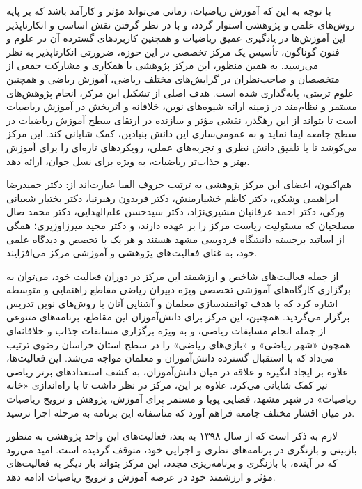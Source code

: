 \documentclass[
  letterpaper,
  DIV=11,
  numbers=noendperiod]{scrreprt}
\begin{document}
با توجه به این که آموزش ریاضیات، زمانی می‌تواند مؤثر و کارآمد باشد که بر
پایه روش‌های علمی و پژوهشی استوار گردد، و با در نظر گرفتن نقش اساسی و
انکارناپذیر این آموزش‌ها در یادگیری عمیق ریاضیات و همچنین کاربردهای
گسترده آن در علوم و فنون گوناگون، تأسیس یک مرکز تخصصی در این حوزه،
ضرورتی انکارناپذیر به نظر می‌رسید. به همین منظور، این مرکز پژوهشی با
همکاری و مشارکت جمعی از متخصصان و صاحب‌نظران در گرایش‌های مختلف ریاضی،
آموزش ریاضی و همچنین علوم تربیتی، پایه‌گذاری شده است. هدف اصلی از تشکیل
این مرکز، انجام پژوهش‌های مستمر و نظام‌مند در زمینه ارائه شیوه‌های نوین،
خلاقانه و اثربخش در آموزش ریاضیات است تا بتواند از این رهگذر، نقشی مؤثر
و سازنده در ارتقای سطح آموزش ریاضیات در سطح جامعه ایفا نماید و به
عمومی‌سازی این دانش بنیادین، کمک شایانی کند. این مرکز می‌کوشد تا با تلفیق
دانش نظری و تجربه‌های عملی، رویکردهای تازه‌ای را برای آموزش بهتر و جذاب‌تر
ریاضیات، به ویژه برای نسل جوان، ارائه دهد.

هم‌اکنون، اعضای این مرکز پژوهشی به ترتیب حروف الفبا عبارت‌اند از: دکتر
حمیدرضا ابراهیمی وشکی، دکتر کاظم خشیارمنش، دکتر فریدون رهبرنیا، دکتر
بختیار شعبانی ورکی، دکتر احمد عرفانیان مشیری‌نژاد، دکتر سیدحسن
علم‌الهدایی، دکتر محمد صال مصلحیان که مسئولیت ریاست مرکز را بر عهده
دارند، و دکتر مجید میرزاوزیری؛ همگی از اساتید برجسته دانشگاه فردوسی مشهد
هستند و هر یک با تخصص و دیدگاه علمی خود، به غنای فعالیت‌های پژوهشی و
آموزشی مرکز می‌افزایند.

از جمله فعالیت‌های شاخص و ارزشمند این مرکز در دوران فعالیت خود، می‌توان به
برگزاری کارگاه‌های آموزشی تخصصی ویژه دبیران ریاضی مقاطع راهنمایی و متوسطه
اشاره کرد که با هدف توانمندسازی معلمان و آشنایی آنان با روش‌های نوین
تدریس برگزار می‌گردید. همچنین، این مرکز برای دانش‌آموزان این مقاطع،
برنامه‌های متنوعی از جمله انجام مسابقات ریاضی، و به ویژه برگزاری مسابقات
جذاب و خلاقانه‌ای همچون «شهر ریاضی» و «بازی‌های ریاضی» را در سطح استان
خراسان رضوی ترتیب می‌داد که با استقبال گسترده دانش‌آموزان و معلمان مواجه
می‌شد. این فعالیت‌ها، علاوه بر ایجاد انگیزه و علاقه در میان دانش‌آموزان، به
کشف استعدادهای برتر ریاضی نیز کمک شایانی می‌کرد. علاوه بر این، مرکز در
نظر داشت تا با راه‌اندازی «خانه ریاضیات» در شهر مشهد، فضایی پویا و مستمر
برای آموزش، پژوهش و ترویج ریاضیات در میان اقشار مختلف جامعه فراهم آورد
که متأسفانه این برنامه به مرحله اجرا نرسید.

لازم به ذکر است که از سال ۱۳۹۸ به بعد، فعالیت‌های این واحد پژوهشی به
منظور بازبینی و بازنگری در برنامه‌های نظری و اجرایی خود، متوقف گردیده
است. امید می‌رود که در آینده، با بازنگری و برنامه‌ریزی مجدد، این مرکز
بتواند بار دیگر به فعالیت‌های مؤثر و ارزشمند خود در عرصه آموزش و ترویج
ریاضیات ادامه دهد.
\end{document}
